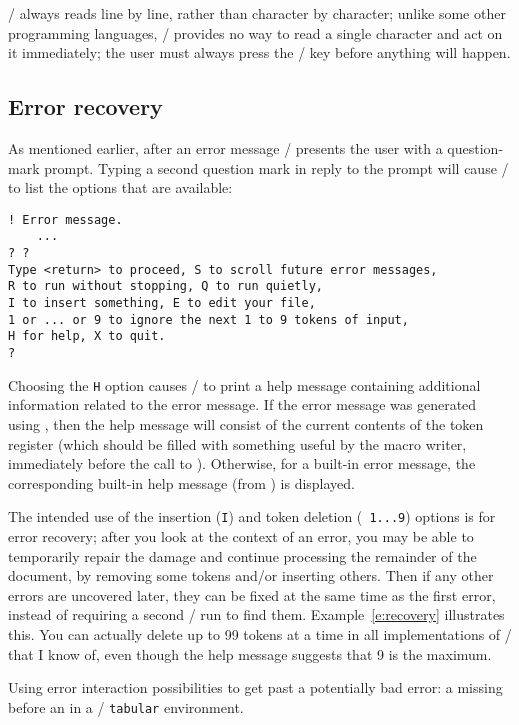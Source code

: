 {\tex/ always reads line by line, rather than character by character;
unlike some other programming languages, \tex/ provides no way to read a
single character and act on it immediately; the user must always press
the \return/ key before anything will happen.

\subsection{Error recovery}\label{s:error-recov}
 As mentioned earlier, after an error message \tex/ presents the user
with a question-mark prompt.  Typing a second question mark in reply
to the prompt will cause \tex/ to list the options that are
available:
 \begin{verbatim}
! Error message.
    ...
? ?
Type <return> to proceed, S to scroll future error messages,
R to run without stopping, Q to run quietly,
I to insert something, E to edit your file,
1 or ... or 9 to ignore the next 1 to 9 tokens of input,
H for help, X to quit.
?
\end{verbatim}
 Choosing the {\tt H} option causes \tex/ to print a help message
containing additional information related to the error message.
If the error message was generated using , then
the help message will consist of the current contents of the
token register  (which should be filled with something
useful by the macro writer, immediately before the call
to ). Otherwise, for a built-in error message,
the corresponding built-in help message (from ) is
displayed.

The intended use of the insertion ({\tt I}) and token deletion ({\tt
1...9})  options is for error recovery; after you look at the context
of an error, you may be able to temporarily repair the damage and
continue processing the remainder of the document, by removing some
tokens and/or inserting others. Then if any other errors are uncovered
later, they can be fixed at the same time as the first error, instead
of requiring a second \tex/ run to find them. Example~\ref{e:recovery}
illustrates this. You can actually delete up to 99 tokens at a time in
all implementations of \tex/ that I know of, even though the help
message suggests that 9 is the maximum.

\begin{example}
\begin{examplebox}%
%
\caption[]{Using error interaction possibilities to
get past a potentially bad error: a missing {\tt\string\\} before an
 in a \latex/ {\tt tabular} environment.}\label{e:recovery}%


\end{examplebox}
\end{example}}
